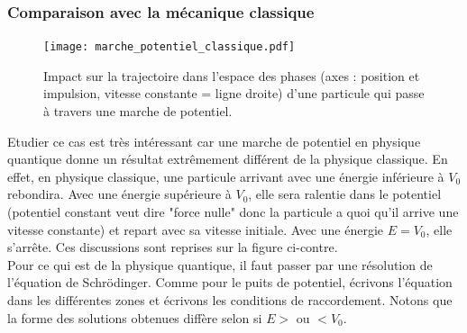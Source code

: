 \documentclass[12pt, a4paper]{book}
\begin{document}
\subsubsection{Comparaison avec la mécanique classique}
\begin{figure}
  \centering
  \texttt{[image: marche\_potentiel\_classique.pdf]}
  \caption{Impact sur la trajectoire dans l'espace des phases (axes : position et impulsion, vitesse constante = ligne droite) d'une particule qui passe à travers une marche de potentiel.}
  \label{fig:ch2-marche_potentiel_classique}
\end{figure}

Etudier ce cas est très intéressant car une marche de potentiel en physique quantique donne un résultat extrêmement différent de la physique classique. En effet, en physique classique, une particule arrivant avec une énergie inférieure à $V_0$ rebondira. Avec une énergie supérieure à $V_0$, elle sera ralentie dans le potentiel (potentiel constant veut dire "force nulle" donc la particule a quoi qu'il arrive une vitesse constante) et repart avec sa vitesse initiale. Avec une énergie $E= V_0$, elle s'arrête.  Ces discussions sont reprises sur la figure ci-contre. \\

Pour ce qui est de la physique quantique, il faut passer par une résolution de l'équation de Schrödinger. Comme pour le puits de potentiel, écrivons l'équation dans les différentes zones et écrivons les conditions de raccordement. Notons que la forme des solutions obtenues diffère selon si $E>$ ou $< V_0$.
\end{document}
